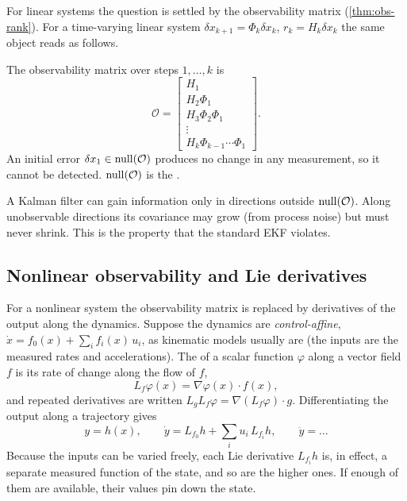 For linear systems the question is settled by the observability matrix (\cref{thm:obs-rank}). For a time-varying linear system
$\delta x_{k+1} = \Phi_k\delta x_k$, $r_k = H_k\delta x_k$ the same object reads as follows.

\begin{definition}
\label{def:obs-matrix}
The observability matrix over steps $1, \dots, k$ is
\begin{equation}
  \mathcal{O} = \begin{bmatrix} H_1 \\ H_2\Phi_1 \\ H_3\Phi_2\Phi_1 \\ \vdots \\ H_k\Phi_{k-1}\cdots\Phi_1 \end{bmatrix}.
\end{equation}
An initial error $\delta x_1 \in \operatorname{null}(\mathcal{O})$ produces no change in any measurement, so it cannot be detected.
$\operatorname{null}(\mathcal{O})$ is the .
\end{definition}

A Kalman filter can gain information only in directions outside $\operatorname{null}(\mathcal{O})$. Along unobservable directions its covariance may grow
(from process noise) but must never shrink. This is the property that the standard EKF violates.

\subsection{Nonlinear observability and Lie derivatives}

For a nonlinear system the observability matrix is replaced by derivatives of the output along the dynamics. Suppose the dynamics are
\emph{control-affine}, $\dot x = f_0(x) + \sum_i f_i(x)\,u_i$, as kinematic models usually are (the inputs are the measured rates and
accelerations). The  of a scalar function $\varphi$ along a vector field $f$ is its rate of change along the flow of $f$,
\begin{equation}
  L_f\varphi(x) = \nabla\varphi(x)\cdot f(x),
\end{equation}
and repeated derivatives are written $L_gL_f\varphi = \nabla(L_f\varphi)\cdot g$. Differentiating the output along a trajectory gives
\begin{equation}
  y = h(x), \qquad \dot y = L_{f_0}h + \sum_i u_i\,L_{f_i}h, \qquad \ddot y = \dots
\end{equation}
Because the inputs can be varied freely, each Lie derivative $L_{f_i}h$ is, in effect, a separate measured function of the state, and so are
the higher ones. If enough of them are available, their values pin down the state.

